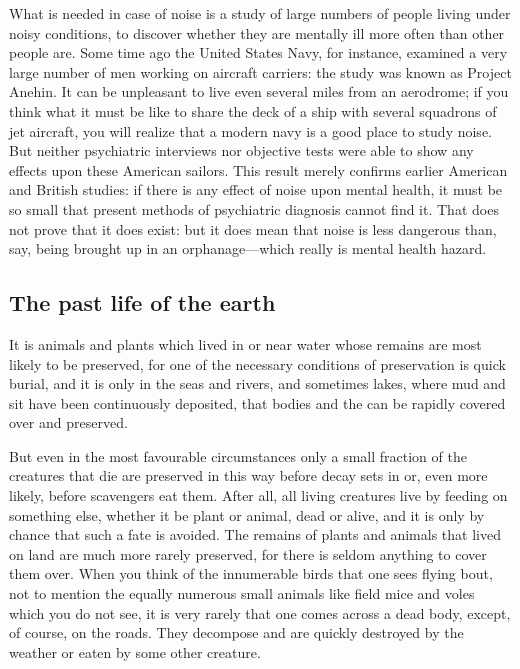 \documentclass[11pt]{article}
\begin{document}
What is needed in case of noise is a study of large numbers of people living under noisy conditions, to discover whether they are mentally ill more often than other people are. Some time ago the United States Navy, for instance, examined a very large number of men working on aircraft carriers: the study was known as Project Anehin. It can be unpleasant to live even several miles from an aerodrome; if you think what it must be like to share the deck of a ship with several squadrons of jet aircraft, you will realize that a modern navy is a good place to study noise. But neither psychiatric interviews nor objective tests were able to show any effects upon these American sailors. This result merely confirms earlier American and British studies: if there is any effect of noise upon mental health, it must be so small that present methods of psychiatric diagnosis cannot find it. That does not prove that it does exist: but it does mean that noise is less dangerous than, say, being brought up in an orphanage---which really is mental health hazard.
\subsection{The past life of the earth}
\label{sec-2-26}

It is animals and plants which lived in or near water whose remains are most likely to be preserved, for one of the necessary conditions of preservation is quick burial, and it is only in the seas and rivers, and sometimes lakes, where mud and sit have been continuously deposited, that bodies and the can be rapidly covered over and preserved.

But even in the most favourable circumstances only a small fraction of the creatures that die are preserved in this way before decay sets in or, even more likely, before scavengers eat them. After all, all living creatures live by feeding on something else, whether it be plant or animal, dead or alive, and it is only by chance that such a fate is avoided. The remains of plants and animals that lived on land are much more rarely preserved, for there is seldom anything to cover them over. When you think of the innumerable birds that one sees flying bout, not to mention the equally numerous small animals like field mice and voles which you do not see, it is very rarely that one comes across a dead body, except, of course, on the roads. They decompose and are quickly destroyed by the weather or eaten by some other creature.
\end{document}
